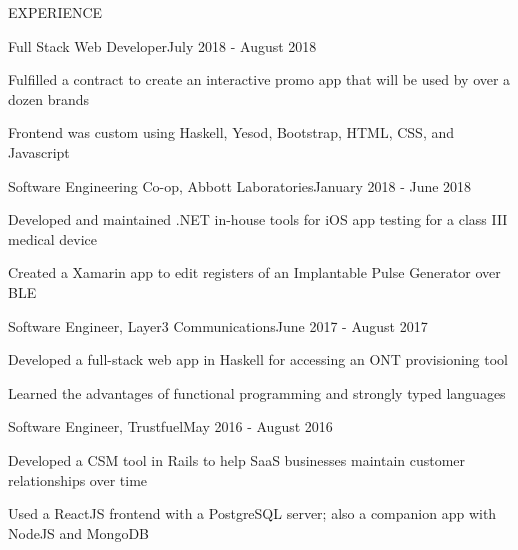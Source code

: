 \documentclass{resume} %
\begin{document}
\begin{rSection}{EXPERIENCE}

  \begin{rSubsection}{Full Stack Web Developer}{July 2018 - August 2018}{}{}
  \item Fulfilled a contract to create an interactive promo app that will be used by over a dozen brands
  \item Frontend was custom using Haskell, Yesod, Bootstrap, HTML, CSS, and Javascript
  \end{rSubsection} 


  \begin{rSubsection}{Software Engineering Co-op, Abbott Laboratories}{January 2018 - June 2018}{}{}
  \item Developed and maintained .NET in-house tools for iOS app testing for a class III medical device
  \item Created a Xamarin app to edit registers of an Implantable Pulse Generator over BLE
  \end{rSubsection} 


  \begin{rSubsection}{Software Engineer, Layer3 Communications}{June 2017 - August 2017}{}{}
  \item Developed a full-stack web app in Haskell for accessing an ONT provisioning tool
  \item Learned the advantages of functional programming and strongly typed languages
  \end{rSubsection} 


  \begin{rSubsection}{Software Engineer, Trustfuel}{May 2016 - August 2016}{}{}
  \item Developed a CSM tool in Rails to help SaaS businesses maintain customer relationships over time
  \item Used a ReactJS frontend with a PostgreSQL server; also a companion app with NodeJS and MongoDB
  \end{rSubsection} 

\end{rSection}
\end{document}
